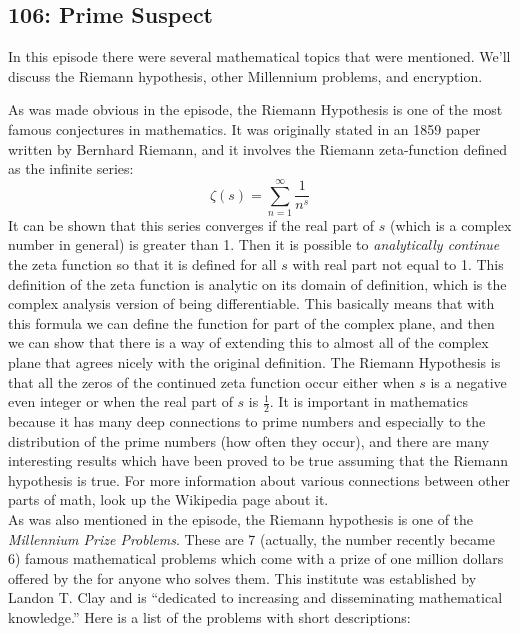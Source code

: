 \newpage
\subsection{106: Prime Suspect\label{106}}

In this episode there were several mathematical topics that were mentioned. We'll discuss the Riemann hypothesis, other Millennium problems, and encryption. \\


As was made obvious in the episode, the Riemann Hypothesis is one of the most famous conjectures in mathematics. It was originally stated in an 1859 paper written by Bernhard Riemann, and it involves the Riemann zeta-function defined as the infinite series:
	\[
	\zeta(s)= \sum_{n=1}^\infty \frac{1}{n^s}
	\]
It can be shown that this series converges if the real part of $s$ (which is a complex number in general) is greater than 1. Then it is possible to \emph{analytically continue} the zeta function so that it is defined for all $s$ with real part not equal to 1. This definition of the zeta function is analytic on its domain of definition, which is the complex analysis version of being differentiable. This basically means that with this formula we can define the function for part of the complex plane, and then we can show that there is a way of extending this to almost all of the complex plane that agrees nicely with the original definition. The Riemann Hypothesis is that all the zeros of the continued zeta function occur either when $s$ is a negative even integer or when the real part of $s$ is $\frac{1}{2}$. It is important in mathematics because it has many deep connections to prime numbers and especially to the distribution of the prime numbers (how often they occur), and there are many interesting results which have been proved to be true assuming that the Riemann hypothesis is true. For more information about various connections between other parts of math, look up the Wikipedia page about it. \\

As was also mentioned in the episode, the Riemann hypothesis is one of the \emph{Millennium Prize Problems}. These are 7 (actually, the number recently became 6) famous mathematical problems which come with a prize of one million dollars offered by the  for anyone who solves them. This institute was established by Landon T. Clay and is ``dedicated to increasing and disseminating mathematical knowledge.'' Here is a list of the problems with short descriptions:

